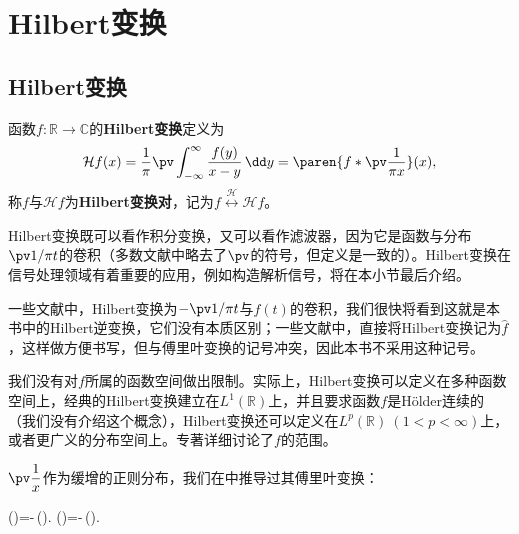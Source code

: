 \section{Hilbert变换}\label{sec:Hilbert}

\subsection{Hilbert变换}\label{sub:hilbert}

\begin{definition}[Hilbert变换]
    函数$f:\mathbb{R}\to\mathbb{C}$的\textbf{Hilbert变换}定义为
    \begin{equation}
        \mathcal{H}f(x)=\frac{1}{\pi}\pv\int_{-\infty}^{\infty}\frac{f(y)}{x-y}\,\dd y=\paren{f*\pv\frac{1}{\pi x}}(x),
    \end{equation}
    称$f$与$\mathcal{H}f$为\textbf{Hilbert变换对}，记为$f\overset{\mathcal{H}}{\longleftrightarrow}\mathcal{H}f$。
\end{definition}

Hilbert变换既可以看作积分变换，又可以看作滤波器，因为它是函数与分布$\pv 1/\pi t$的卷积（多数文献中略去了$\pv$的符号，但定义是一致的）。Hilbert变换在信号处理领域有着重要的应用，例如构造解析信号，将在本小节最后介绍。

\begin{remark}
    一些文献中\cite{brad_osgood_ee261}，Hilbert变换为$-\pv 1/\pi t$与$f(t)$的卷积，我们很快将看到这就是本书中的Hilbert逆变换，它们没有本质区别；一些文献中\cite{signal_systems}，直接将Hilbert变换记为$\hat{f}$，这样做方便书写，但与傅里叶变换的记号冲突，因此本书不采用这种记号。
\end{remark}
\begin{remark}
    我们没有对$f$所属的函数空间做出限制。实际上，Hilbert变换可以定义在多种函数空间上，经典的Hilbert变换建立在$L^1(\mathbb{R})$上，并且要求函数$f$是Hölder连续的（我们没有介绍这个概念），Hilbert变换还可以定义在$L^p(\mathbb{R})\ (1<p<\infty)$上，或者更广义的分布空间上。专著\cite{hilbert_transform}详细讨论了$f$的范围。
\end{remark}

$\displaystyle\pv\frac{1}{x}$作为缓增的正则分布，我们在中推导过其傅里叶变换：
\begin{lralign}
    (\xi)=-\im\,\sgn(\xi).
    \switch
    (\omega)=-\im\,\sgn(\omega).
\end{lralign}

